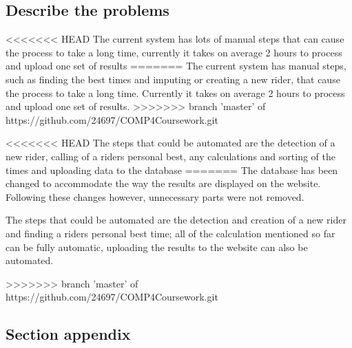 \subsection{Describe the problems}
<<<<<<< HEAD
The current system has lots of manual steps that can cause the process to take a long time, currently it takes on average 2 hours to process and upload one set of results
=======
The current system has manual steps, such as finding the best times and imputing or creating a new rider, that cause the process to take a long time. Currently it takes on average 2 hours to process and upload one set of results.
>>>>>>> branch 'master' of https://github.com/24697/COMP4Coursework.git

<<<<<<< HEAD
The steps that could be automated are the detection of a new rider, calling of a riders personal best, any calculations and sorting of the times and uploading data to the database
=======
The database has been changed to accommodate the way the results are displayed on the website. Following these changes  however, unnecessary parts were not removed.

The steps that could be automated are the detection and creation of a new rider and finding a riders personal best time; all of the calculation mentioned so far can be fully automatic, uploading the results to the website can also be automated.


>>>>>>> branch 'master' of https://github.com/24697/COMP4Coursework.git
\subsection{Section appendix}

